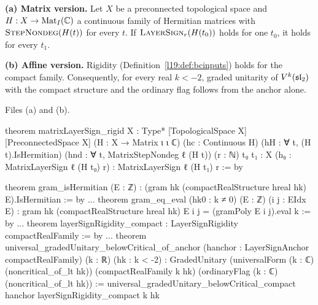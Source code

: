 \begin{theorem}\label{l19:thm:bcrigid}
\textbf{(a) Matrix version.} Let $X$ be a preconnected topological space and $H:X\to\mathrm{Mat}_I({\mathbb{C}})$ a continuous
family of Hermitian matrices with $\textsc{StepNondeg}(H(t))$ for every $t$. If $\textsc{LayerSign}_r(H(t_0))$ holds for one
$t_0$, it holds for every $t_1$.

\textbf{(b) Affine version.} Rigidity (Definition~\ref{l19:def:bcinputs}) holds for the compact family. Consequently, for
every real $k<-2$, graded unitarity of $V^k(\mathfrak{sl}_2)$ with the compact structure and the ordinary flag follows from
the anchor alone.
\end{theorem}

{\raggedright\noindent Files  (a) and
 (b).\par}
\begin{leancode}
theorem matrixLayerSign_rigid {X : Type*} [TopologicalSpace X] [PreconnectedSpace X]
    (H : X → Matrix ι ι ℂ) (hc : Continuous H) (hH : ∀ t, (H t).IsHermitian)
    (hnd : ∀ t, MatrixStepNondeg ℓ (H t)) (r : ℕ) {t₀ t₁ : X}
    (h₀ : MatrixLayerSign ℓ (H t₀) r) : MatrixLayerSign ℓ (H t₁) r := by

theorem gram_isHermitian (E : ℤ) : (gram hk (compactRealStructure hreal hk) E).IsHermitian := by
...
theorem gram_eq_eval (hk0 : k ≠ 0) (E : ℤ) (i j : EIdx E) :
    gram hk (compactRealStructure hreal hk) E i j = (gramPoly E i j).eval k := by
...
theorem layerSignRigidity_compact : LayerSignRigidity compactRealFamily := by
...
theorem universal_gradedUnitary_belowCritical_of_anchor
    (hanchor : LayerSignAnchor compactRealFamily) (k : ℝ) (hk : k < -2) :
    GradedUnitary (universalForm (k : ℂ) (noncritical_of_lt hk)) (compactRealFamily k hk)
      (ordinaryFlag (k : ℂ) (noncritical_of_lt hk)) :=
  universal_gradedUnitary_belowCritical_compact hanchor layerSignRigidity_compact k hk
\end{leancode}

